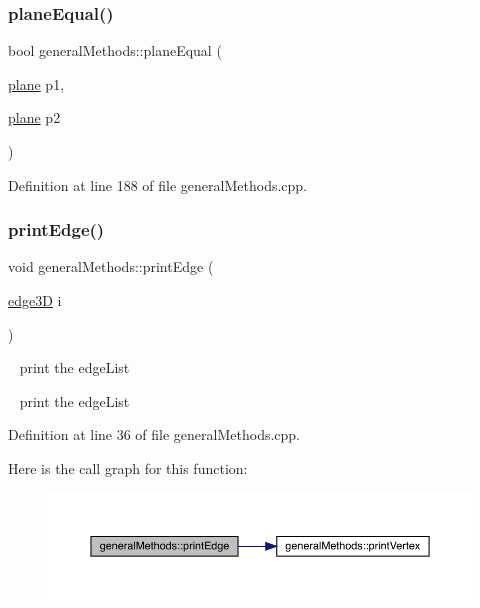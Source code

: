 \subsubsection{\texorpdfstring{plane\+Equal()}{planeEqual()}}
{\footnotesize\ttfamily bool general\+Methods\+::plane\+Equal (\begin{DoxyParamCaption}\item[{\mbox{\hyperlink{structplane}{plane}}}]{p1,  }\item[{\mbox{\hyperlink{structplane}{plane}}}]{p2 }\end{DoxyParamCaption})}



Definition at line 188 of file general\+Methods.\+cpp.

\mbox{\label{namespacegeneral_methods_af9a1c28dacf89e746b51916fe178ce1a}} 
\subsubsection{\texorpdfstring{print\+Edge()}{printEdge()}}
{\footnotesize\ttfamily void general\+Methods\+::print\+Edge (\begin{DoxyParamCaption}\item[{\mbox{\hyperlink{structedge3_d}{edge3D}}}]{i }\end{DoxyParamCaption})}

~\newline
print the edge\+List

~\newline
print the edge\+List

Definition at line 36 of file general\+Methods.\+cpp.

Here is the call graph for this function\+:
\nopagebreak
\begin{figure}[H]
\begin{center}
\leavevmode
\includegraphics[width=350pt]{namespacegeneral_methods_af9a1c28dacf89e746b51916fe178ce1a_cgraph}
\end{center}
\end{figure}
\mbox{\label{namespacegeneral_methods_ab6b6f8a5d92b39ead6c97ec0917b75a4}} 
